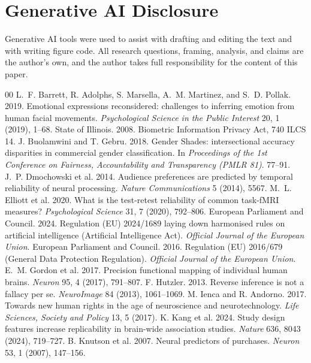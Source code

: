 \documentclass[sigconf,review,anonymous]{acmart}
\begin{document}
\section*{Generative AI Disclosure}
Generative AI tools were used to assist with drafting and editing the text and with writing figure code. All
research questions, framing, analysis, and claims are the author's own, and the author takes full
responsibility for the content of this paper.


\begin{thebibliography}{00}
 L.~F. Barrett, R. Adolphs, S. Marsella, A.~M. Martinez, and S.~D. Pollak. 2019. Emotional expressions reconsidered: challenges to inferring emotion from human facial movements. \emph{Psychological Science in the Public Interest} 20, 1 (2019), 1--68.
 State of Illinois. 2008. Biometric Information Privacy Act, 740 ILCS 14.
 J. Buolamwini and T. Gebru. 2018. Gender Shades: intersectional accuracy disparities in commercial gender classification. In \emph{Proceedings of the 1st Conference on Fairness, Accountability and Transparency (PMLR 81)}. 77--91.
 J.~P. Dmochowski et al. 2014. Audience preferences are predicted by temporal reliability of neural processing. \emph{Nature Communications} 5 (2014), 5567.
 M.~L. Elliott et al. 2020. What is the test-retest reliability of common task-fMRI measures? \emph{Psychological Science} 31, 7 (2020), 792--806.
 European Parliament and Council. 2024. Regulation (EU) 2024/1689 laying down harmonised rules on artificial intelligence (Artificial Intelligence Act). \emph{Official Journal of the European Union}.
 European Parliament and Council. 2016. Regulation (EU) 2016/679 (General Data Protection Regulation). \emph{Official Journal of the European Union}.
 E.~M. Gordon et al. 2017. Precision functional mapping of individual human brains. \emph{Neuron} 95, 4 (2017), 791--807.
 F. Hutzler. 2013. Reverse inference is not a fallacy per se. \emph{NeuroImage} 84 (2013), 1061--1069.
 M. Ienca and R. Andorno. 2017. Towards new human rights in the age of neuroscience and neurotechnology. \emph{Life Sciences, Society and Policy} 13, 5 (2017).
 K. Kang et al. 2024. Study design features increase replicability in brain-wide association studies. \emph{Nature} 636, 8043 (2024), 719--727.
 B. Knutson et al. 2007. Neural predictors of purchases. \emph{Neuron} 53, 1 (2007), 147--156.

\end{thebibliography}
\end{document}
